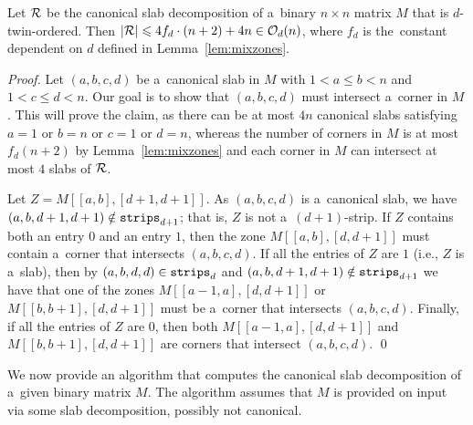 \documentclass[runningheads]{llncs}
\newcommand{\Oh}{\mathcal{O}}
\renewcommand{\leq}{\leqslant}
\begin{document}
\begin{lemma}\label{lem:canonical-small}
	Let $\cal R$ be the canonical slab decomposition of a~binary $n\times n$ matrix $M$ that is $d$-twin-ordered. Then $|{\cal R}|\leq 4 f_d \cdot (n+2)+4n \in \Oh_d(n)$, where $f_d$ is 
	the~constant dependent on $d$ defined in Lemma~\ref{lem:mixzones}.
\end{lemma}
\begin{proof}
	Let $(a,b,c,d)$ be a~canonical slab in $M$ with $1<a\leq b< n$ and $1<c\leq d<n$.
	Our goal is to show that $(a,b,c,d)$ must intersect a~corner in $M$. This will prove the claim, as there can be at most $4n$ canonical slabs satisfying $a=1$ or $b=n$ or $c=1$ or $d=n$, whereas the number of corners in $M$ is at most $f_d(n+2)$ by Lemma~\ref{lem:mixzones} and each corner in $M$ can intersect at most $4$ slabs of $\cal R$.
	
	Let $Z=M[[a,b],[d+1,d+1]]$.
	As $(a,b,c,d)$ is a~canonical slab, we have $(a,b,d+1,d+1)\notin \mathtt{strips}_{d+1}$; that is, $Z$ is not a~$(d+1)$-strip. If $Z$ contains both an entry $0$ and an entry $1$, then the zone $M[[a,b],[d,d+1]]$ must contain a~corner that intersects $(a,b,c,d)$. If all the entries of $Z$ are $1$ (i.e., $Z$ is a~slab), then by $(a,b,d,d)\in \mathtt{strips}_d$ and $(a,b,d+1,d+1)\notin \mathtt{strips}_{d+1}$ we have that one of the zones $M[[a-1,a],[d,d+1]]$ or $M[[b,b+1],[d,d+1]]$ must be a~corner that intersects $(a,b,c,d)$. Finally, if all the entries of $Z$ are $0$, then both  $M[[a-1,a],[d,d+1]]$ and $M[[b,b+1],[d,d+1]]$ are corners that intersect $(a,b,c,d)$.
\qed
\end{proof}
















We now provide an algorithm that computes the canonical slab decomposition of a~given binary matrix $M$. The algorithm assumes that $M$ is provided on input via some slab decomposition, possibly not canonical.
\end{document}

